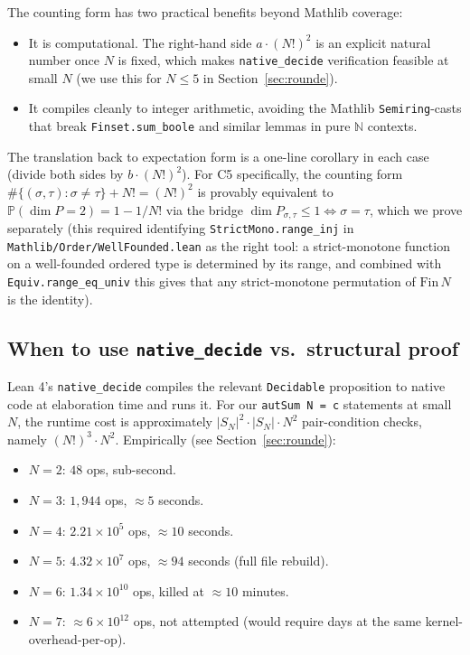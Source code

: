 \documentclass[11pt]{article}
\theoremstyle{definition}
\begin{document}
The counting form has two practical benefits beyond Mathlib coverage:
\begin{itemize}
    \item It is computational. The right-hand side $a \cdot (N!)^2$ is an explicit
    natural number once $N$ is fixed, which makes \texttt{native\_decide}
    verification feasible at small $N$ (we use this for $N \le 5$ in
    Section~\ref{sec:rounde}).
    \item It compiles cleanly to integer arithmetic, avoiding the Mathlib
    \texttt{Semiring}-casts that break \texttt{Finset.sum\_boole} and similar
    lemmas in pure $\mathbb{N}$ contexts.
\end{itemize}

The translation back to expectation form is a one-line corollary in each case
(divide both sides by $b \cdot (N!)^2$). For C5 specifically, the counting form
$\#\{ (\sigma, \tau) : \sigma \neq \tau \} + N! = (N!)^2$ is provably equivalent
to $\mathbb{P}(\dim P = 2) = 1 - 1/N!$ via the bridge
$\dim P_{\sigma, \tau} \le 1 \iff \sigma = \tau$, which we prove separately
(this required identifying \texttt{StrictMono.range\_inj} in
\texttt{Mathlib/Order/WellFounded.lean} as the right tool: a strict-monotone
function on a well-founded ordered type is determined by its range, and combined
with \texttt{Equiv.range\_eq\_univ} this gives that any strict-monotone permutation
of $\mathrm{Fin}\,N$ is the identity).

\subsection{When to use \texttt{native\_decide} vs.\ structural proof}

Lean 4's \texttt{native\_decide} compiles the relevant \texttt{Decidable}
proposition to native code at elaboration time and runs it. For our
\texttt{autSum\,N = c} statements at small $N$, the runtime cost is approximately
$|S_N|^2 \cdot |S_N| \cdot N^2$ pair-condition checks, namely $(N!)^3 \cdot N^2$.
Empirically (see Section~\ref{sec:rounde}):

\begin{itemize}
    \item $N = 2$: $48$ ops, sub-second.
    \item $N = 3$: $1{,}944$ ops, $\approx 5$ seconds.
    \item $N = 4$: $2.21 \times 10^5$ ops, $\approx 10$ seconds.
    \item $N = 5$: $4.32 \times 10^7$ ops, $\approx 94$ seconds (full file rebuild).
    \item $N = 6$: $1.34 \times 10^{10}$ ops, killed at $\approx 10$ minutes.
    \item $N = 7$: $\approx 6 \times 10^{12}$ ops, not attempted (would require
    days at the same kernel-overhead-per-op).
\end{itemize}
\end{document}
